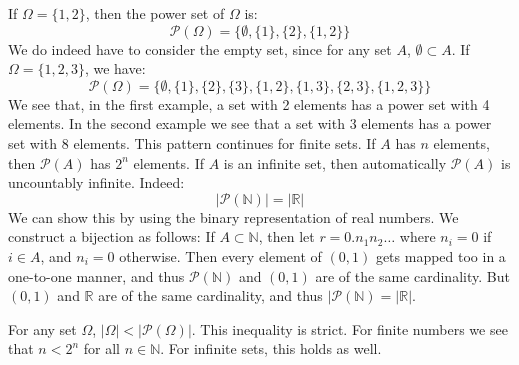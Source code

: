 \documentclass[crop=false,class=book,oneside]{standalone}
\begin{document}
            \begin{example}
                If $\Omega=\{1,2\}$, then the power set of $\Omega$
                is:
                \begin{equation}
                    \mathcal{P}(\Omega)=
                    \{\emptyset,\{1\},\{2\},\{1,2\}\}
                \end{equation}
                We do indeed have to consider the empty set, since
                for any set $A$, $\emptyset\subset{A}$. If
                $\Omega=\{1,2,3\}$, we have:
                \begin{equation}
                    \mathcal{P}(\Omega)=
                    \{\emptyset,\{1\},\{2\},\{3\},\{1,2\},
                      \{1,3\},\{2,3\},\{1,2,3\}\}
                \end{equation}
                We see that, in the first example, a set with
                2 elements has a power set with 4 elements. In the
                second example we see that a set with 3 elements has
                a power set with 8 elements. This pattern continues
                for finite sets. If $A$ has $n$ elements, then
                $\mathcal{P}(A)$ has $2^{n}$ elements. If
                $A$ is an infinite set, then automatically
                $\mathcal{P}(A)$ is uncountably infinite. Indeed:
                \begin{equation}
                    |\mathcal{P}(\mathbb{N})|=|\mathbb{R}|
                \end{equation}
                We can show this by using the binary representation
                of real numbers. We construct a bijection as
                follows: If $A\subset\mathbb{N}$, then
                let $r=0.n_{1}n_{2}\hdots$ where
                $n_{i}=0$ if $i\in{A}$, and $n_{i}=0$ otherwise.
                Then every element of $(0,1)$ gets mapped too in
                a one-to-one manner, and thus
                $\mathcal{P}(\mathbb{N})$ and $(0,1)$ are of the
                same cardinality. But $(0,1)$ and $\mathbb{R}$
                are of the same cardinality, and thus
                $|\mathcal{P}(\mathbb{N})=|\mathbb{R}|$.
            \end{example}
            For any set $\Omega$, $|\Omega|<|\mathcal{P}(\Omega)|$.
            This inequality is strict. For finite numbers we see
            that $n<2^{n}$ for all $n\in\mathbb{N}$. For infinite
            sets, this holds as well.
\end{document}
